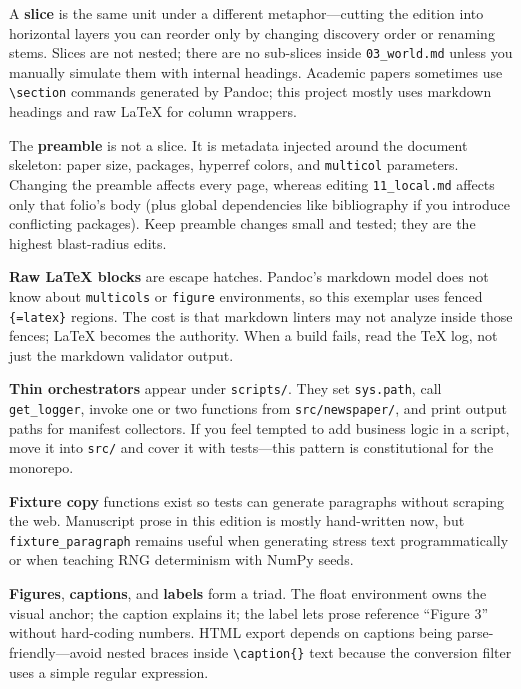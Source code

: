 \documentclass[
]{article}
\begin{document}
A \textbf{slice} is the same unit under a different metaphor---cutting
the edition into horizontal layers you can reorder only by changing
discovery order or renaming stems. Slices are not nested; there are no
sub-slices inside \texttt{03\_world.md} unless you manually simulate
them with internal headings. Academic papers sometimes use
\texttt{\textbackslash{}section} commands generated by Pandoc; this
project mostly uses markdown headings and raw LaTeX for column wrappers.

The \textbf{preamble} is not a slice. It is metadata injected around the
document skeleton: paper size, packages, hyperref colors, and
\texttt{multicol} parameters. Changing the preamble affects every page,
whereas editing \texttt{11\_local.md} affects only that folio's body
(plus global dependencies like bibliography if you introduce conflicting
packages). Keep preamble changes small and tested; they are the highest
blast-radius edits.

\textbf{Raw LaTeX blocks} are escape hatches. Pandoc's markdown model
does not know about \texttt{multicols} or \texttt{figure} environments,
so this exemplar uses fenced \texttt{\{=latex\}} regions. The cost is
that markdown linters may not analyze inside those fences; LaTeX becomes
the authority. When a build fails, read the TeX log, not just the
markdown validator output.

\textbf{Thin orchestrators} appear under \texttt{scripts/}. They set
\texttt{sys.path}, call \texttt{get\_logger}, invoke one or two
functions from \texttt{src/newspaper/}, and print output paths for
manifest collectors. If you feel tempted to add business logic in a
script, move it into \texttt{src/} and cover it with tests---this
pattern is constitutional for the monorepo.

\textbf{Fixture copy} functions exist so tests can generate paragraphs
without scraping the web. Manuscript prose in this edition is mostly
hand-written now, but \texttt{fixture\_paragraph} remains useful when
generating stress text programmatically or when teaching RNG determinism
with NumPy seeds.

\textbf{Figures}, \textbf{captions}, and \textbf{labels} form a triad.
The float environment owns the visual anchor; the caption explains it;
the label lets prose reference ``Figure 3'' without hard-coding numbers.
HTML export depends on captions being parse-friendly---avoid nested
braces inside \texttt{\textbackslash{}caption\{\}} text because the
conversion filter uses a simple regular expression.
\end{document}
